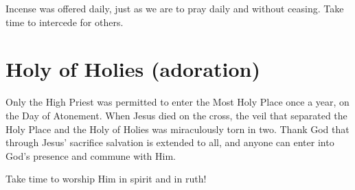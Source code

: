 Incense was offered daily, just as we are to pray daily and without ceasing.  Take time to intercede for others.


\section{Holy of Holies (adoration)}

Only the High Priest was permitted to enter the Most Holy Place
once a year, on the Day of Atonement.
When Jesus died on the cross, the veil that separated the Holy Place
and the Holy of Holies was miraculously torn in two.
Thank God that through Jesus' sacrifice salvation is extended to all,
and anyone can enter into God’s presence and commune with Him.

Take time to worship Him in spirit and in ruth!
